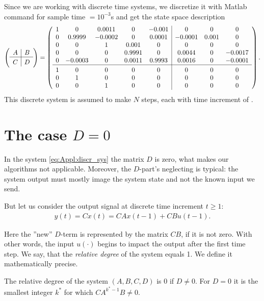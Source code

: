 Since we are working with discrete time systems, we discretize it with Matlab command   for sample time $ = 10^{-3}$s  and get the state space description 
\begin{align}
\label{eq:Appl:discr_sys}
\left( \begin{array}{c | c}
A & B \\ \hline C & D
\end{array}\right) = 
\left(\begin{array}{c c c c c|c c c}
1&    0&    0.0011&    0&   -0.001&    0&    0&    0\\
0&    0.9999&   -0.0002&         0&    0.0001&   -0.0001&    0.001&   0\\
0&    0&    1&         0.001&   0&    0&    0&   0\\
0&    0&   0&         0.9991&   0&    0.0044&    0&   -0.0017\\
0&   -0.0003&    0&         0.0011&    0.9993&    0.0016&   0&   -0.0001\\\hline
1&    0&         0&         0&         0&         0&         0&         0\\
0&    1&         0&         0&         0&         0&         0&         0\\
0&         0&    1&         0&         0&         0&         0&         0
\end{array}\right). 
\end{align}
This discrete system is assumed to make $N$ steps, each with time increment of . 

\section{The case $D = 0$}

In the system \eqref{eq:Appl:discr_sys} the matrix $D$ is zero, what makes our algorithms not applicable. 
Moreover, the  $D$-part's neglecting is typical: the system output must mostly image the system state and not the known input we send.

But let us consider the output signal at discrete time increment $t\geq 1$:
\begin{align}
y(t) = C x(t) = CA x(t-1) + C B u(t-1).
\end{align}

Here the ''new'' $D$-term is represented by the matrix $CB$, if it is not zero. 
With other words, the input $u(\cdot)$ begins to impact the output after the first time step. We say, that the  \textit{relative degree} of the system equals 1. We define it mathematically precise.
\begin{defi}
	The relative degree of the system $(A, B, C, D)$ is 0 if $D \neq 0$. For $D = 0$ it is the smallest integer $k^*$ for which $	C A^{k^*-1} B \neq 0$.
\end{defi} 

